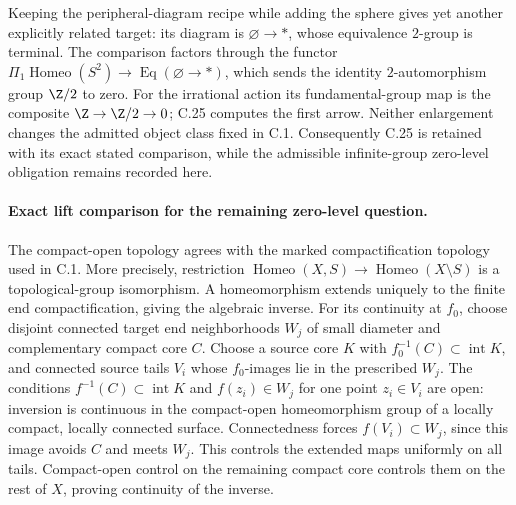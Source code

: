 Keeping the peripheral-diagram recipe while adding the sphere gives
yet another explicitly related target: its diagram is
$\varnothing\to *$, whose equivalence $2$-group is terminal. The
comparison factors through the functor
$\Pi_1\operatorname{Homeo}(S^2)\to\operatorname{Eq}(\varnothing\to*)$,
which sends the identity $2$-automorphism group $\Z/2$ to zero. For the
irrational action its fundamental-group map is the composite
$\Z\to\Z/2\to0$; C.25 computes the first arrow. Neither enlargement
changes the admitted object class fixed in C.1. Consequently C.25 is
retained with its exact stated comparison, while the admissible
infinite-group zero-level obligation remains recorded here.

\paragraph{Exact lift comparison for the remaining zero-level question.}
The compact-open topology agrees with the marked compactification
topology used in C.1. More precisely, restriction
$\operatorname{Homeo}(X,S)\to\operatorname{Homeo}(X\setminus S)$
is a topological-group isomorphism. A homeomorphism extends uniquely
to the finite end compactification, giving the algebraic inverse.
For its continuity at $f_0$, choose disjoint connected target end
neighborhoods $W_j$ of small diameter and complementary compact
core $C$. Choose a source core $K$ with
$f_0^{-1}(C)\subset\operatorname{int}K$, and connected source tails
$V_i$ whose $f_0$-images lie in the prescribed $W_j$.
The conditions $f^{-1}(C)\subset\operatorname{int}K$ and
$f(z_i)\in W_j$ for one point $z_i\in V_i$ are open:
inversion is continuous in the compact-open homeomorphism group
of a locally compact, locally connected surface.
Connectedness forces $f(V_i)\subset W_j$, since this image avoids
$C$ and meets $W_j$. This controls the extended maps uniformly on
all tails. Compact-open control on the remaining compact core
controls them on the rest of $X$, proving continuity of the inverse.

